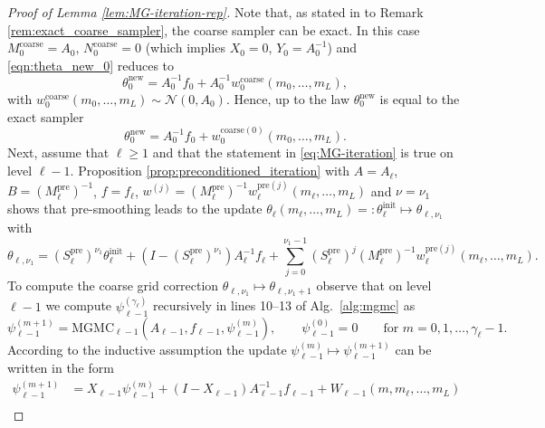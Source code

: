 \documentclass[11pt,english]{article}
\theoremstyle{plain}
\theoremstyle{plain}
\theoremstyle{plain}
\theoremstyle{plain}
\numberwithin{equation}{section}
\newcommand*{\id}{I}
\begin{document}
\begin{proof}[Proof of Lemma \ref{lem:MG-iteration-rep}]
	Note that, as stated in to Remark \ref{rem:exact_coarse_sampler}, the coarse sampler can be exact. In this case $M_0^{\mathrm{coarse}} = A_0$,	$N_0^{\mathrm{coarse}}=0$ (which implies $X_0=0$, $Y_0=A_0^{-1}$) and \eqref{eqn:theta_new_0} reduces to
	\begin{equation}
		\theta_0^{\mathrm{new}} = A_0^{-1} f_0 +
		A_{0}^{-1}w_{0}^{\mathrm{coarse}}(m_{0},\dots,m_{L}),
	\end{equation}
	with $w_{0}^{\mathrm{coarse}}(m_0,\dots,m_{L}) \sim\mathcal{N}(0,A_0)$. Hence, up to the law 	$\theta_0^{\mathrm{new}}$ is equal to the exact sampler
	\begin{equation}
		\theta_0^{\mathrm{new}} = A_0^{-1} f_0 +
		w_0^{\mathrm{coarse}(0)}(m_0,\dots,m_L).
	\end{equation}
	Next, assume that $\ell\ge 1$ and that the statement in \eqref{eq:MG-iteration} is true on level $\ell-1$. Proposition \ref{prop:preconditioned_iteration} with $A=A_\ell$, $B=(M_\ell^{\mathrm{pre}})^{-1}$, $f=f_\ell$, $w^{(j)}=(M_\ell^{\mathrm{pre}})^{-1}w_\ell^{\mathrm{pre}(j)}(m_{\ell},\dots,m_L)$ and $\nu=\nu_1$ shows that pre-smoothing leads to the update $\theta_{\ell}(m_\ell,\dots,m_L)=: \theta_{\ell}^{\mathrm{init}}\mapsto \theta_{\ell,\nu_1}$ with
	\begin{equation}
		\theta_{\ell,\nu_1} = (S_\ell^{\mathrm{pre}})^{\nu_1} \theta_\ell^{\mathrm{init}} + (\id-(S_{\ell}^{\mathrm{pre}})^{\nu_1}) A_{\ell}^{-1}f_{\ell} + \sum_{j=0}^{\nu_1-1} (S_\ell^{\mathrm{pre}})^j (M_\ell^{\mathrm{pre}})^{-1} w_\ell^{\mathrm{pre}(j)}(m_{\ell},\dots,m_L).
		\label{eqn:pre_update}
	\end{equation}
	To compute the coarse grid correction $\theta_{\ell,\nu_1} \mapsto \theta_{\ell,\nu_1+1}$ observe that on level $\ell-1$ we compute $\psi^{(\gamma_\ell)}_{\ell-1}$ recursively in lines 10--13 of Alg.~\ref{alg:mgmc} as
	\begin{equation}
		\psi^{(m+1)}_{\ell-1} = \mathrm{MGMC}_{\ell-1}(A_{\ell-1},f_{\ell-1},\psi^{(m)}_{\ell-1}),\qquad \psi^{(0)}_{\ell-1}=0\qquad\text{for $m=0,1,\dots,\gamma_\ell-1$}.
	\end{equation}
	According to the inductive assumption the update $\psi_{\ell-1}^{(m)}\mapsto \psi_{\ell-1}^{(m+1)}$ can be written in the form
	\begin{equation}
		\begin{aligned}
			\psi_{\ell-1}^{(m+1)} & =X_{\ell-1} \psi_{\ell-1}^{(m)}+(\id-X_{\ell-1})A_{\ell-1}^{-1} f_{\ell-1} + W_{\ell-1}(m,m_{\ell},\dots,m_L)                          \\

\end{aligned}
\end{equation}
\end{proof}
\end{document}
